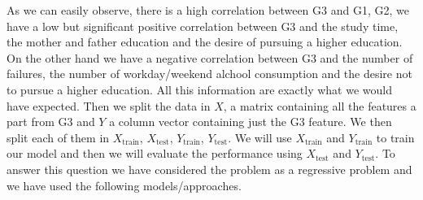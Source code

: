 \documentclass[a4paper, 11pt]{article}
\theoremstyle{definition}
\numberwithin{equation}{section}		%
\numberwithin{table}{section}				%
\begin{document}
As we can easily observe, there is a high correlation between G3 and G1, G2, we have a low but significant positive correlation between G3 and the study time, the mother and father education and the desire of pursuing a higher education. On the other hand we have a negative correlation between G3 and the number of failures, the number of workday/weekend alchool consumption and the desire not to pursue a higher education. All this information are exactly what we would have expected. Then we split the data in $X$, a matrix containing all the features a part from G3 and $Y$ a column vector containing just the G3 feature. We then split each of them in $X_{\text{train}}$, $X_{\text{test}}$, $Y_{\text{train}}$, $Y_{\text{test}}$. We will use $X_{\text{train}}$ and $Y_{\text{train}}$ to train our model and then we will evaluate the performance using $X_{\text{test}}$ and $Y_{\text{test}}$. To answer this question we have considered the problem as a regressive problem and we have used the following models/approaches.  
\newpage
\end{document}
